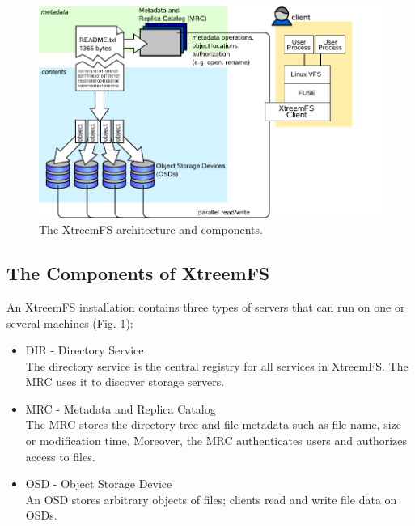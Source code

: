 \documentclass[a4paper,10pt]{book}
\begin{document}
\begin{figure}
 \centering
 \includegraphics[width=\textwidth]{images/architecture.pdf}
 \caption{The XtreemFS architecture and components.}
 \label{fig:architecture}
\end{figure}


\subsection{The Components of XtreemFS}

An XtreemFS installation contains three types of servers that can run on one or several machines (Fig. \ref{fig:architecture}):

\begin{itemize}
 \item DIR - Directory Service\\
 The directory service is the central registry for all services in XtreemFS. The MRC uses it to discover storage servers.
 \item MRC - Metadata and Replica Catalog\\
 The MRC stores the directory tree and file metadata such as file name, size or modification time. Moreover, the MRC authenticates users and authorizes access to files.
 \item OSD - Object Storage Device\\
 An OSD stores arbitrary objects of files; clients read and write file data on OSDs.
\end{itemize}
\end{document}
